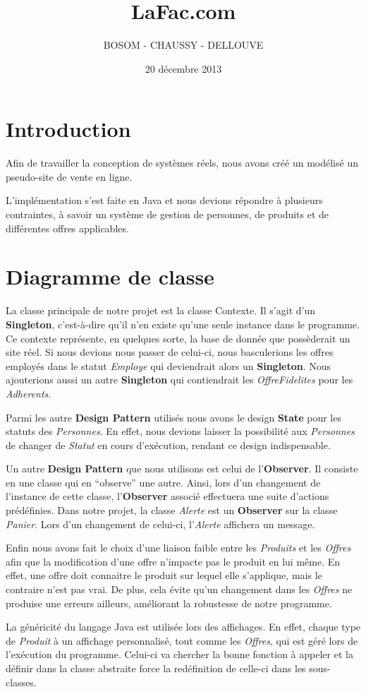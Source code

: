 \documentclass{article}
\title{LaFac.com}
\author{BOSOM - CHAUSSY - DELLOUVE}
\date{20 décembre 2013}
\begin{document}
\maketitle

\vfill
\section*{Introduction}

Afin de travailler la conception de systèmes réels, nous avons créé un modélisé un pseudo-site de vente en ligne.\par
L'implémentation s'est faite en Java et nous devions répondre à plusieurs contraintes, à savoir un système de gestion de personnes, de produits et de différentes offres applicables.
\vfill

\clearpage

\section*{Diagramme de classe}

La classe principale de notre projet est la classe Contexte.
Il s'agit d'un \textbf{Singleton}, c'est-à-dire qu'il n'en existe qu'une seule instance dans le programme.
Ce contexte représente, en quelques sorte, la base de donnée que possèderait un site réel.
Si nous devions nous passer de celui-ci, nous basculerions les offres employés dans le statut \emph{Employe} qui deviendrait alors un \textbf{Singleton}.
Nous ajouterions aussi un autre \textbf{Singleton} qui contiendrait les \emph{OffreFidelites} pour les \emph{Adherents}.
\par
Parmi les autre \textbf{Design Pattern} utilisés nous avons le design \textbf{State} pour les statuts des \emph{Personnes}.
En effet, nous devions laisser la possibilité aux \emph{Personnes} de changer de \emph{Statut} en cours d'exécution, rendant ce design indispensable.
\par
Un autre \textbf{Design Pattern} que nous utilisons est celui de l'\textbf{Observer}.
Il consiste en une classe qui en ``observe'' une autre.
Ainsi, lors d'un changement de l'instance de cette classe, l'\textbf{Observer} associé effectuera une suite d'actions prédéfinies.
Dans notre projet, la classe \emph{Alerte} est un \textbf{Observer} sur la classe \emph{Panier}.
Lors d'un changement de celui-ci, l'\emph{Alerte} affichera un message.
\par
Enfin nous avons fait le choix d'une liaison faible entre les \emph{Produits} et les \emph{Offres} afin que la modification d'une offre n'impacte pas le produit en lui même.
En effet, une offre doit connaitre le produit sur lequel elle s'applique, mais le contraire n'est pas vrai.
De plus, cela évite qu'un changement dans les \emph{Offres} ne produise une erreurs ailleurs, améliorant la robustesse de notre programme.
\par
La généricité du langage Java est utilisée lors des affichages.
En effet, chaque type de \emph{Produit} à un affichage personnalisé, tout comme les \emph{Offres}, qui est géré lors de l'exécution du programme.
Celui-ci va chercher la bonne fonction à appeler et la définir dans la classe abstraite force la redéfinition de celle-ci dans les sous-classes.
\end{document}
